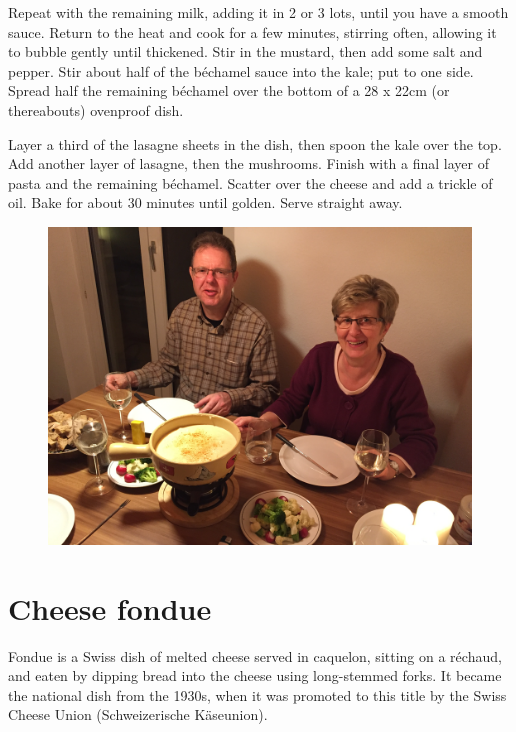 \documentclass{tufte-book}
\begin{document}
Repeat with the remaining milk, adding it in 2 or 3 lots, until you have a smooth sauce. Return to the heat and cook for a few minutes, stirring often, allowing it to bubble gently until thickened. Stir in the mustard, then add some salt and pepper. Stir about half of the b\'echamel sauce into the kale; put to one side. Spread half the remaining b\'echamel over the bottom of a 28 x 22cm (or thereabouts) ovenproof dish.

Layer a third of the lasagne sheets in the dish, then spoon the kale over the top. Add another layer of lasagne, then the mushrooms. Finish with a final layer of pasta and the remaining b\'echamel. Scatter over the cheese and add a trickle of oil. Bake for about 30 minutes until golden. Serve straight away.



\newpage

\begin{figure}[h]
  \includegraphics[width=\linewidth]{fondue.jpg}
\end{figure}

\section{Cheese fondue}

Fondue is a Swiss dish of melted cheese served in caquelon, sitting on a r\'echaud, and eaten by dipping bread into the cheese using long-stemmed forks. It became the national dish from the 1930s, when it was promoted to this title by the Swiss Cheese Union (Schweizerische K\"aseunion).
\end{document}
